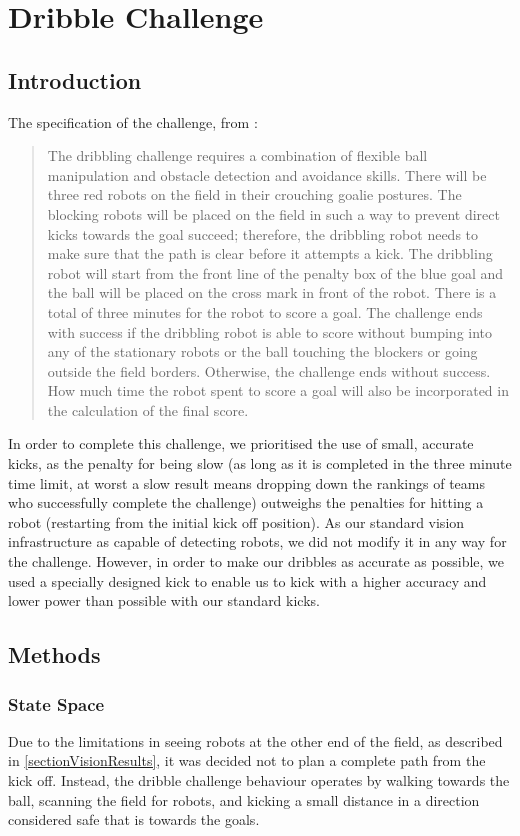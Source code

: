 \documentclass[pdftex,11pt,a4paper]{report}
\begin{document}
\section{Dribble Challenge}
\subsection{Introduction}
The specification of the challenge, from \cite{ChallengeRules}:

\begin{quotation}
The dribbling challenge requires a combination of flexible ball manipulation and obstacle detection and avoidance skills. There will be three red robots on the field in their
crouching goalie postures. The blocking robots will be placed on the field in such a way
to prevent direct kicks towards the goal succeed; therefore, the dribbling robot needs
to make sure that the path is clear before it attempts a kick. The dribbling robot will
start from the front line of the penalty box of the blue goal and the ball will be placed
on the cross mark in front of the robot. There is a total of three minutes for the robot
to score a goal. The challenge ends with success if the dribbling robot is able to score
without bumping into any of the stationary robots or the ball touching the blockers or
going outside the field borders. Otherwise, the challenge ends without success. How
much time the robot spent to score a goal will also be incorporated in the calculation
of the final score.
\end{quotation}

In order to complete this challenge, we prioritised the use of small, accurate kicks, as the penalty for being slow (as long as it is completed in the three minute time limit, at worst a slow result means dropping down the rankings of teams who successfully complete the challenge) outweighs the penalties for hitting a robot (restarting from the initial kick off position). As our standard vision infrastructure as capable of detecting robots, we did not modify it in any way for the challenge. However, in order to make our dribbles as accurate as possible, we used a specially designed kick to enable us to kick with a higher accuracy and lower power than possible with our standard kicks. 
\subsection{Methods}
\subsubsection{State Space}
Due to the limitations in seeing robots at the other end of the field, as described in \autoref{sectionVisionResults}, it was decided not to plan a complete path from the kick off. Instead, the dribble challenge behaviour operates by walking towards the ball, scanning the field for robots, and kicking a small distance in a direction considered safe that is towards the goals. 
\end{document}
